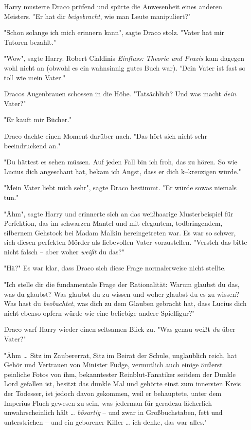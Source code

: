 {Harry musterte Draco prüfend und spürte die Anwesenheit eines anderen Meisters. "Er hat dir \emph{beigebracht}, wie man Leute manipuliert?"

"Schon solange ich mich erinnern kann", sagte Draco stolz. "Vater hat mir Tutoren bezahlt."

"Wow", sagte Harry. Robert Cialdinis \emph{Einfluss: Theorie und Praxis} kam dagegen wohl nicht an (obwohl es ein wahnsinnig gutes Buch war). "Dein Vater ist fast so toll wie mein Vater."

Dracos Augenbrauen schossen in die Höhe. "Tatsächlich? Und was macht \emph{dein} Vater?"

"Er kauft mir Bücher."

Draco dachte einen Moment darüber nach. "Das hört sich nicht sehr beeindruckend an."

"Du hättest es sehen müssen. Auf jeden Fall bin ich froh, das zu hören. So wie Lucius dich angeschaut hat, bekam ich Angst, dass er dich k--kreuzigen würde."

"Mein Vater liebt mich sehr", sagte Draco bestimmt. "Er würde sowas niemals tun."

"Ähm", sagte Harry und erinnerte sich an das weißhaarige Musterbeispiel für Perfektion, das im schwarzen Mantel und mit elegantem, todbringendem, silbernem Gehstock bei Madam Malkin hereingetreten war. Es war so schwer, sich diesen perfekten Mörder als liebevollen Vater vorzustellen. "Versteh das bitte nicht falsch -- aber woher \emph{weißt} du das?"

"Hä?" Es war klar, dass Draco sich diese Frage normalerweise nicht stellte.

"Ich stelle dir die fundamentale Frage der Rationalität: Warum glaubst du das, was du glaubst? Was glaubst du zu wissen und woher glaubst du es zu wissen? Was hast du \emph{beobachtet}, was dich zu dem Glauben gebracht hat, dass Lucius dich nicht ebenso opfern würde wie eine beliebige andere Spielfigur?"

Draco warf Harry wieder einen seltsamen Blick zu. "Was genau weißt \emph{du} über Vater?"

"Ähm … Sitz im Zaubererrat, Sitz im Beirat der Schule, unglaublich reich, hat Gehör und Vertrauen von Minister Fudge, vermutlich auch einige äußerst peinliche Fotos von ihm, bekanntester Reinblut-Fanatiker seitdem der Dunkle Lord gefallen ist, besitzt das dunkle Mal und gehörte einst zum innersten Kreis der Todesser, ist jedoch davon gekommen, weil er behauptete, unter dem Imperius-Fluch gewesen zu sein, was jederman für geradezu lächerlich unwahrscheinlich hält … \emph{bösartig} -- und zwar in Großbuchstaben, fett und unterstrichen -- und ein geborener Killer … ich denke, das war alles."

}
